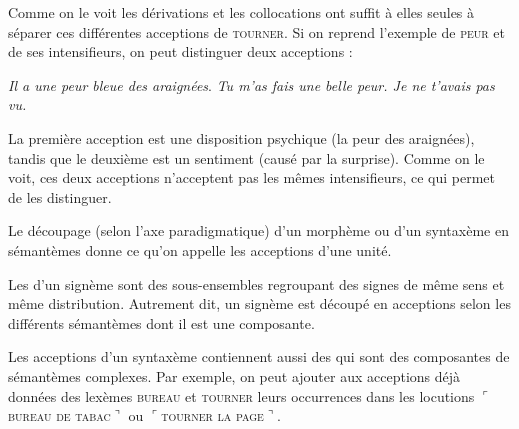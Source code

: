 Comme on le voit les dérivations et les collocations ont suffit à elles seules à séparer ces différentes acceptions de \textsc{tourner}. Si on reprend l’exemple de \textsc{peur} et de ses intensifieurs, on peut distinguer deux acceptions :

\ea
    \ea \textit{Il a une peur bleue des araignées}.
    \ex \textit{Tu m’as fais une belle peur. Je ne t’avais pas vu.}
\z
\ex
{}
\z
\z

La première acception est une disposition psychique (la peur des araignées), tandis que le deuxième est un sentiment (causé par la surprise). Comme on le voit, ces deux acceptions n’acceptent pas les mêmes intensifieurs, ce qui permet de les distinguer.

Le découpage (selon l’axe paradigmatique) d’un morphème ou d’un syntaxème en sémantèmes donne ce qu’on appelle les acceptions d’une unité.

{Les  d’un signème sont des sous-ensembles regroupant des signes de même sens et même distribution. Autrement dit, un signème est découpé en acceptions selon les différents sémantèmes dont il est une composante.}

Les acceptions d’un syntaxème contiennent aussi des  qui sont des composantes de sémantèmes complexes. Par exemple, on peut ajouter aux acceptions déjà données des lexèmes \textsc{bureau} et \textsc{tourner} leurs occurrences dans les locutions $⌜$\textsc{bureau} \textsc{de} \textsc{tabac}$⌝$ ou $⌜$\textsc{tourner} \textsc{la} \textsc{page}$⌝$.

